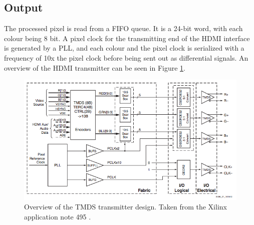 \subsection{Output}
The processed pixel is read from a FIFO queue. It is a 24-bit word, with each colour being 8 bit.
A pixel clock for the transmitting end of the HDMI interface is generated by a PLL,
and each colour and the pixel clock is serialized with a frequency of 10x the pixel clock before being sent out as differential signals.
An overview of the HDMI transmitter can be seen in Figure \ref{fig:TMDSTransmitter}.

\begin{figure}[h!]
    \centering
    \includegraphics[width=\linewidth]{img/TMDStransmitterdesign.png}
    \caption{Overview of the TMDS transmitter design. Taken from the Xilinx application note 495 \cite{xapp495}.}
    \label{fig:TMDSTransmitter}
\end{figure}
